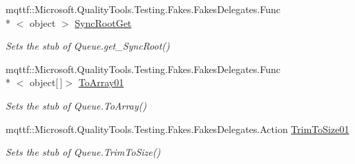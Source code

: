 \begin{DoxyCompactItemize}
mqttf\-::\-Microsoft.\-Quality\-Tools.\-Testing.\-Fakes.\-Fakes\-Delegates.\-Func\\*
$<$ object $>$ \hyperlink{class_system_1_1_collections_1_1_fakes_1_1_stub_queue_ac27f830b8b245b67771a53301542ed43}{Sync\-Root\-Get}
\begin{DoxyCompactList}\small\item\em Sets the stub of Queue.\-get\-\_\-\-Sync\-Root()\end{DoxyCompactList}\item 
mqttf\-::\-Microsoft.\-Quality\-Tools.\-Testing.\-Fakes.\-Fakes\-Delegates.\-Func\\*
$<$ object\mbox{[}$\,$\mbox{]}$>$ \hyperlink{class_system_1_1_collections_1_1_fakes_1_1_stub_queue_ae9f3e1e46864199f9d6181ed78a51f29}{To\-Array01}
\begin{DoxyCompactList}\small\item\em Sets the stub of Queue.\-To\-Array()\end{DoxyCompactList}\item 
mqttf\-::\-Microsoft.\-Quality\-Tools.\-Testing.\-Fakes.\-Fakes\-Delegates.\-Action \hyperlink{class_system_1_1_collections_1_1_fakes_1_1_stub_queue_a407fedfcafb310701d7434bcbafb6783}{Trim\-To\-Size01}
\begin{DoxyCompactList}\small\item\em Sets the stub of Queue.\-Trim\-To\-Size()\end{DoxyCompactList}\end{DoxyCompactItemize}
